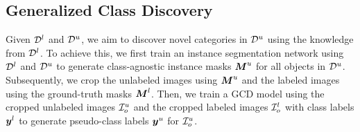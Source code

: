 









\subsection{Generalized Class Discovery}
\label{sec:class_discovery}
Given $\mathcal{D}^l$ and $\mathcal{D}^u$, we aim to discover novel categories in $\mathcal{D}^u$ using the knowledge from $\mathcal{D}^l$. To achieve this, we first train an instance segmentation network using $\mathcal{D}^l$ and $\mathcal{D}^u$ to generate class-agnostic instance masks $\boldsymbol{M}^u$ for all objects in $\mathcal{D}^u$. Subsequently, we crop the unlabeled images using $\boldsymbol{M}^u$ and the labeled images using the ground-truth masks $\boldsymbol{M}^l$. Then, we train a GCD model using the cropped unlabeled images $\mathcal{I}^u_o$ and the cropped labeled images $\mathcal{I}^l_o$ with class labels $\boldsymbol{y}^l$ to generate pseudo-class labels $\boldsymbol{y}^u$ for $\mathcal{I}^u_o$.

